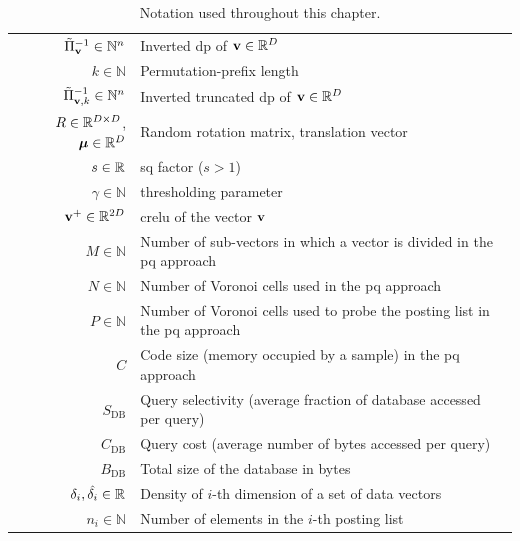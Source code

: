 \begin{table}
\begin{tabularx}{\linewidth}{rX}
$\tilde{\Pi}^{-1}_{\mathbf{v}} \in \mathbb{N}^n$       & Inverted \gls{dp} of $\mathbf{v}\in \mathbb{R}^{D}$ \\ \addlinespace[0.5em]
$k \in \mathbb{N}$                             & Permutation-prefix length \\ \addlinespace[0.5em]
$\tilde{\Pi}^{-1}_{\mathbf{v},k} \in \mathbb{N}^n$     & Inverted truncated \gls{dp} of $\mathbf{v}\in \mathbb{R}^{D}$ \\ \addlinespace[0.5em]
$R \in \mathbb{R}^{{D} \times {D}}$, $\boldsymbol {\mu} \in \mathbb{R}^{{D}} $ & Random rotation matrix, translation vector \\ \addlinespace[0.5em]
$s \in \mathbb{R}$                                     & \acrlong{sq} factor ($s>1$) \\ \addlinespace[0.5em]
$\gamma \in \mathbb{N}$                        & thresholding parameter \\ \addlinespace[0.5em]
$\mathbf{v}^+ \in \mathbb{R}^{2{D}  }$                          & \gls{crelu} of the vector $\mathbf{v}$ \\ \addlinespace[0.5em]
$M \in \mathbb{N}$                             & Number of sub-vectors in which a vector is divided in the \gls{pq} approach \\ \addlinespace[0.5em]
$N \in \mathbb{N}$                             & Number of Voronoi cells used in the \gls{pq} approach \\ \addlinespace[0.5em]
$P \in \mathbb{N}$                             & Number of Voronoi cells used to probe the posting list in the \gls{pq} approach \\ \addlinespace[0.5em]
$C$                                            & Code size (memory occupied by a sample) in the \gls{pq} approach \\ \addlinespace[0.5em]
$S_\text{DB}$                                  & Query selectivity (average fraction of database accessed per query) \\ \addlinespace[0.5em]
$C_\text{DB}$                                  & Query cost (average number of bytes accessed per query) \\ \addlinespace[0.5em]
$B_\text{DB}$                                  & Total size of the database in bytes \\ \addlinespace[0.5em]
$\delta_i, \hat{\delta_i} \in \mathbb{R}$              & Density of $i$-th dimension of a set of data vectors \\ \addlinespace[0.5em]
$ n_i \in \mathbb{N}$                          & Number of elements in the $i$-th posting list \\
\bottomrule
\end{tabularx}
\caption{Notation used throughout this chapter.}
\label{tab:str:notation}
\end{table}

